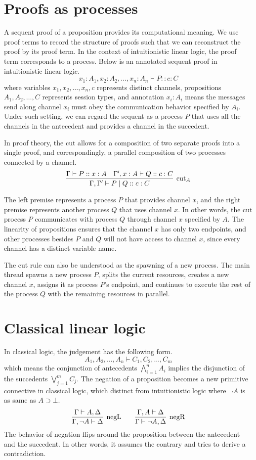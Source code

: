 \documentclass[12pt, openany]{memoir}
\begin{document}
\section{Proofs as processes} 
A sequent proof of a proposition provides its computational meaning.
We use proof terms to record the structure of proofs such that we can reconstruct the proof by its proof term.
In the context of intuitionistic linear logic, the proof term corresponds to a process. 
Below is an annotated sequent proof in intuitionistic linear logic.
\[
  x_1 : A_1, x_2 : A_2, \ldots, x_n : A_n \vdash P :: c : C
\]
where variables $x_1, x_2, \ldots, x_n, c$ represents distinct channels, propositions $A_1, A_2, \ldots, C$ represents session types, 
and annotation $x_i : A_i$ means the messages send along channel $x_i$ must obey the communication behavior specified by $A_i$.
Under such setting, we can regard the sequent as a process $P$ that uses all the channels in the antecedent and provides a channel in the succedent.

In proof theory, the cut allows for a composition of two separate proofs into a single proof, and correspondingly, a parallel composition of two processes connected by a channel.
\[
  \infer[\text{cut}_A]{\Gamma, \Gamma' \vdash P \mid Q :: c : C}{
    \Gamma \vdash P :: x : A
    &
    \Gamma', x : A \vdash Q :: c : C
  }
\]

The left premise represents a process $P$ that provides channel $x$, and the right premise represents another process $Q$ that uses channel $x$. 
In other words, the cut process $P$ communicates with process $Q$ through channel $x$ specified by $A$. 
The linearity of propositions ensures that the channel $x$ has only two endpoints, 
and other processes besides $P$ and $Q$ will not have access to channel $x$, 
since every channel has a distinct variable name.

The cut rule can also be understood as the spawning of a new process. 
The main thread spawns a new process $P$, splits the current resources, creates a new channel $x$,
assigns it as process $P$'s endpoint, and continues to execute the rest of the process $Q$ with the remaining resources in parallel.
\section{Classical linear logic} \label{sec:cll}
In classical logic, the judgement has the following form.
\[
  A_1, A_2, \ldots, A_n \vdash C_1, C_2, \ldots, C_m
\]
which means the conjunction of antecedents $\bigwedge_{i = 1}^n A_i$ implies the disjunction of the succedents $\bigvee_{j = 1}^m C_j$.
The negation of a proposition becomes a new primitive connective in classical logic, which distinct from intuitionistic logic where $\neg A$ is as same as $A \supset \bot$.
\[
  \infer[\text{negL}]{\Gamma, \neg A \vdash \Delta}{\Gamma \vdash A, \Delta}
  \qquad
  \infer[\text{negR}]{\Gamma \vdash \neg A, \Delta}{\Gamma, A \vdash \Delta}
\]
The behavior of negation flips around the proposition between the antecedent and the succedent. 
In other words, it assumes the contrary and tries to derive a contradiction.
\end{document}
